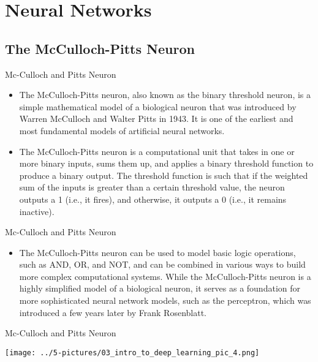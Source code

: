 \documentclass[11pt]{beamer}
\begin{document}
\section{Neural Networks}
%
\subsection{The McCulloch-Pitts Neuron \\ \scalebox{0.8}{	}}
%
\begin{frame}{Mc-Culloch and Pitts Neuron}
\begin{itemize}
\item The McCulloch-Pitts neuron, also known as the binary threshold neuron, is a simple mathematical model of a biological neuron that was introduced by Warren McCulloch and Walter Pitts in 1943. It is one of the earliest and most fundamental models of artificial neural networks.

\item The McCulloch-Pitts neuron is a computational unit that takes in one or more binary inputs, sums them up, and applies a binary threshold function to produce a binary output. The threshold function is such that if the weighted sum of the inputs is greater than a certain threshold value, the neuron outputs a 1 (i.e., it fires), and otherwise, it outputs a 0 (i.e., it remains inactive).
\end{itemize}
\end{frame}
\begin{frame}{Mc-Culloch and Pitts Neuron}
\begin{itemize}
\item The McCulloch-Pitts neuron can be used to model basic logic operations, such as AND, OR, and NOT, and can be combined in various ways to build more complex computational systems. While the McCulloch-Pitts neuron is a highly simplified model of a biological neuron, it serves as a foundation for more sophisticated neural network models, such as the perceptron, which was introduced a few years later by Frank Rosenblatt.
\end{itemize}
\end{frame}
\begin{frame}{Mc-Culloch and Pitts Neuron}
	\begin{center}
	\texttt{[image: ../5-pictures/03\_intro\_to\_deep\_learning\_pic\_4.png]}
	\end{center}
\end{frame}
\end{document}

